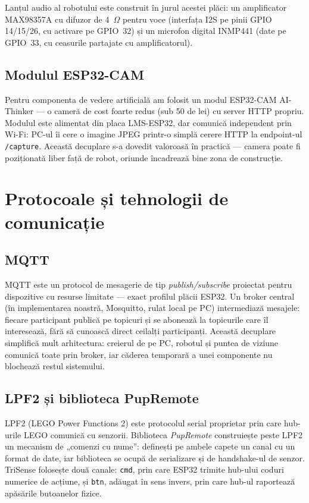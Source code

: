 Lanțul audio al robotului este construit în jurul acestei plăci: un amplificator MAX98357A cu difuzor de 4~$\Omega$ pentru voce (interfața I2S pe pinii GPIO 14/15/26, cu activare pe GPIO~32) și un microfon digital INMP441 (date pe GPIO~33, cu ceasurile partajate cu amplificatorul).

\subsection{Modulul ESP32-CAM}

Pentru componenta de vedere artificială am folosit un modul ESP32-CAM AI-Thinker — o cameră de cost foarte redus (sub 50 de lei) cu server HTTP propriu. Modulul este alimentat din placa LMS-ESP32, dar comunică independent prin Wi-Fi: PC-ul îi cere o imagine JPEG printr-o simplă cerere HTTP la endpoint-ul \texttt{/capture}. Această decuplare s-a dovedit valoroasă în practică — camera poate fi poziționată liber față de robot, oriunde încadrează bine zona de construcție.

\section{Protocoale și tehnologii de comunicație}

\subsection{MQTT}

MQTT \cite{mqtt} este un protocol de mesagerie de tip \emph{publish/subscribe} proiectat pentru dispozitive cu resurse limitate — exact profilul plăcii ESP32. Un broker central (în implementarea noastră, Mosquitto, rulat local pe PC) intermediază mesajele: fiecare participant publică pe topicuri și se abonează la topicurile care îl interesează, fără să cunoască direct ceilalți participanți. Această decuplare simplifică mult arhitectura: creierul de pe PC, robotul și puntea de viziune comunică toate prin broker, iar căderea temporară a unei componente nu blochează restul sistemului.

\subsection{LPF2 și biblioteca PupRemote}

LPF2 (LEGO Power Functions 2) este protocolul serial proprietar prin care hub-urile LEGO comunică cu senzorii. Biblioteca \emph{PupRemote} \cite{pupremote} construiește peste LPF2 un mecanism de „comenzi cu nume”: definești pe ambele capete un canal cu un format de date, iar biblioteca se ocupă de serializare și de handshake-ul de senzor. TriSense folosește două canale: \texttt{cmd}, prin care ESP32 trimite hub-ului coduri numerice de acțiune, și \texttt{btn}, adăugat în sens invers, prin care hub-ul raportează apăsările butoanelor fizice.

